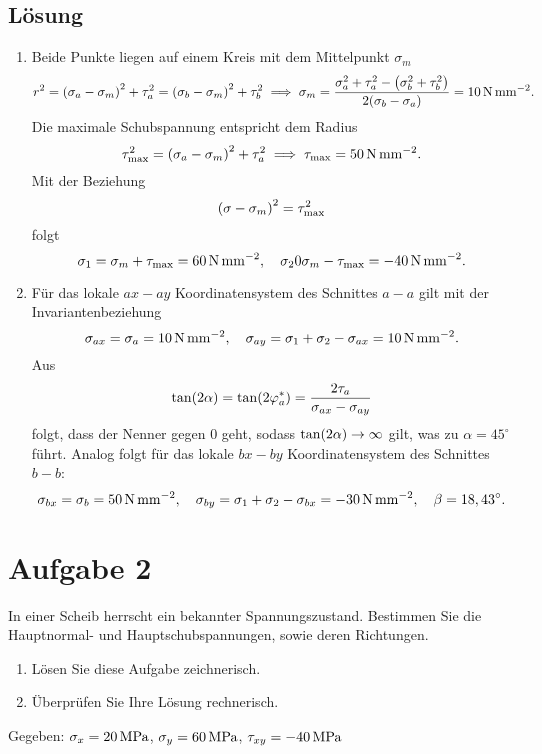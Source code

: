 \documentclass{exercise}
\begin{document}
    \subsection*{Lösung}
    \begin{enumerate}
        \item Beide Punkte liegen auf einem Kreis mit dem Mittelpunkt \(\sigma_m\)
        \[
            r^2 = \parentheses*{\sigma_a - \sigma_m}^2 + \tau_a^2 = \parentheses*{\sigma_b - \sigma_m}^2 + \tau_b^2 \implies \sigma_m = \frac{\sigma_a^2 + \tau_a^2 - \parentheses*{\sigma_b^2 + \tau_b^2}}{2\parentheses*{\sigma_b - \sigma_a}} = 10\sis{\newton\per\milli\meter\squared}.
        \]
        Die maximale Schubspannung entspricht dem Radius
        \[
            \tau_{\text{max}}^2 = \parentheses*{\sigma_a - \sigma_m}^2 + \tau_a^2 \implies \tau_{\text{max}} = 50\sis{\newton\per\milli\meter\squared}.
        \]
        Mit der Beziehung
        \[
            \parentheses*{\sigma - \sigma_m}^2 = \tau_{\text{max}}^2
        \]
        folgt
        \[
            \sigma_1 = \sigma_m + \tau_{\text{max}} = 60\sis{\newton\per\milli\meter\squared}, \quad \sigma_2 0 \sigma_m - \tau_{\text{max}} = -40\sis{\newton\per\milli\meter\squared}.
        \]
        \item Für das lokale \(ax-ay\) Koordinatensystem des Schnittes \(a-a\) gilt mit der Invariantenbeziehung
        \[
            \sigma_{ax} = \sigma_a = 10\sis{\newton\per\milli\meter\squared}, \quad \sigma_{ay} = \sigma_1 + \sigma_2 - \sigma_{ax} = 10\sis{\newton\per\milli\meter\squared}.
        \]
        Aus
        \[
            \tan\parentheses*{2\alpha} = \tan\parentheses*{2\varphi_a^*} = \frac{2\tau_a}{\sigma_{ax} - \sigma_{ay}}
        \]
        folgt, dass der Nenner gegen \(0\) geht, sodass \(\tan\parentheses*{2\alpha} \to \infty\) gilt, was zu \(\alpha = 45^\circ\) führt.
        Analog folgt für das lokale \(bx-by\) Koordinatensystem des Schnittes \(b-b\):
        \[
            \sigma_{bx} = \sigma_b = 50\sis{\newton\per\milli\meter\squared}, \quad \sigma_{by} = \sigma_1 + \sigma_2 - \sigma_{bx} = -30\sis{\newton\per\milli\meter\squared}, \quad \beta = 18,43^\circ.
        \]
    \end{enumerate}


    \section*{Aufgabe 2}

    \begin{problem}
        In einer Scheib herrscht ein bekannter Spannungszustand.
        Bestimmen Sie die Hauptnormal- und Hauptschubspannungen, sowie deren Richtungen.
        \begin{enumerate}
            \item Lösen Sie diese Aufgabe zeichnerisch.
            \item Überprüfen Sie Ihre Lösung rechnerisch.
        \end{enumerate}
        Gegeben: \(\sigma_x = 20\sis{\mega\pascal}\), \(\sigma_y = 60\sis{\mega\pascal}\), \(\tau_{xy} = -40\sis{\mega\pascal}\)
    \end{problem}
\end{document}

